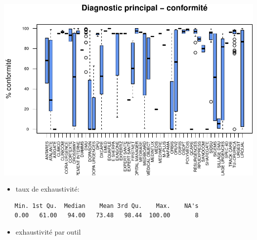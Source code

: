\documentclass[]{article}
\begin{document}
\includegraphics{septembre2015_files/figure-latex/unnamed-chunk-18-1.pdf}

\begin{itemize}
\itemsep1pt\parskip0pt
\item
  taux de exhaustivité:
\end{itemize}

\begin{verbatim}
   Min. 1st Qu.  Median    Mean 3rd Qu.    Max.    NA's 
   0.00   61.00   94.00   73.48   98.44  100.00       8 
\end{verbatim}

\begin{itemize}
\itemsep1pt\parskip0pt
\item
  exhaustivité par outil
\end{itemize}
\end{document}
